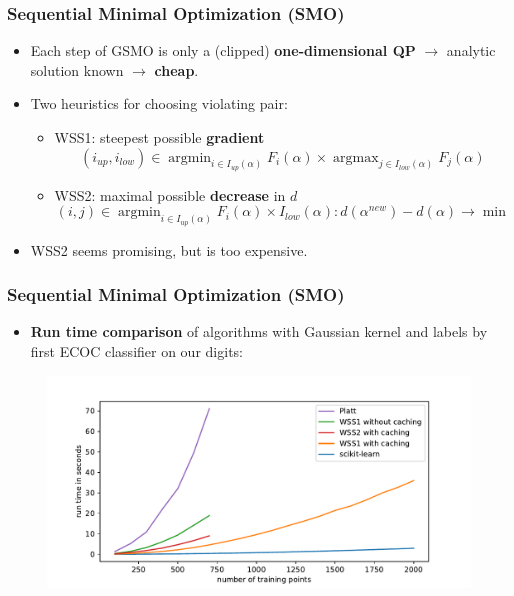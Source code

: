 \documentclass[12pt, compress]{beamer}
\newcommand{\titleC}{Sequential Minimal Optimization (SMO)}
\DeclareMathOperator{\argmax}{argmax}
\DeclareMathOperator{\argmin}{argmin}
\begin{document}
\begin{frame}
\frametitle{\titleC}
\begin{itemize}
	\item Each step of GSMO is only a (clipped) \textbf{\alert{one-dimensional QP}} $\rightarrow$ analytic solution known $\rightarrow$ \textbf{\alert{cheap}}.
	\item Two heuristics for choosing violating pair: \\
	\begin{itemize}
		\item WSS1: steepest possible \textbf{\alert{gradient}}
		\[
		(i_{up},i_{low}) \in \argmin_{i \in I_{up}(\alpha)}F_i(\alpha) \times \argmax_{j \in I_{low}(\alpha)}F_j(\alpha)
		\]
		\item WSS2: maximal possible \textbf{\alert{decrease}} in $d$
		\[
		(i,j) \in \argmin_{i \in I_{up}(\alpha)}F_i(\alpha) \times I_{low}(\alpha): d(\alpha^{new}) - d(\alpha) \rightarrow \min
		\]
		
	\end{itemize}
	\item WSS2 seems promising, but is too expensive.
\end{itemize}
\end{frame}

\begin{frame}
\frametitle{\titleC}
\begin{itemize}
	\item \textbf{\alert{Run time comparison}} of algorithms with Gaussian kernel and labels by first ECOC classifier on our digits:
\end{itemize}

\begin{figure}[h]
	\includegraphics[width=1\textwidth, center]{images_for_presentation/benchplot_gauss.pdf}
	\label{bench_gauss}
\end{figure}

\end{frame}
\end{document}
